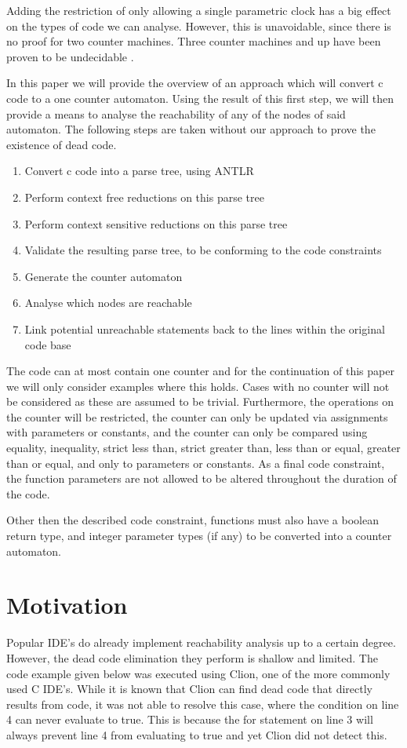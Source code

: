 \documentclass[12pt]{article}
\begin{document}
Adding the restriction of only allowing a single parametric clock has a big effect on the types of code we can analyse. However, this is unavoidable, since there is no proof for two counter machines. Three counter machines and up have been proven to be undecidable \cite{FEARNLEY201526}.

In this paper we will provide the overview of an approach which will convert c code to a one counter automaton. Using the result of this first step, we will then provide a means to analyse the reachability of any of the nodes of said automaton. The following steps are taken without our approach to prove the existence of dead code.

\begin{enumerate}
	\item Convert c code into a parse tree, using ANTLR
	\item Perform context free reductions on this parse tree
	\item Perform context sensitive reductions on this parse tree
	\item Validate the resulting parse tree, to be conforming to the code constraints
	\item Generate the counter automaton
	\item Analyse which nodes are reachable
	\item Link potential unreachable statements back to the lines within the original code base
\end{enumerate}

The code can at most contain one counter and for the continuation of this paper we will only consider examples where this holds. Cases with no counter will not be considered as these are assumed to be trivial. Furthermore, the operations on the counter will be restricted, the counter can only be updated via assignments with parameters or constants, and the counter can only be compared using equality, inequality, strict less than, strict greater than, less than or equal, greater than or equal, and only to parameters or constants. As a final code constraint, the function parameters are not allowed to be altered throughout the duration of the code.

Other then the described code constraint, functions must also have a boolean return type, and integer parameter types (if any) to be converted into a counter automaton.

\section{Motivation}
Popular IDE's do already implement reachability analysis up to a certain degree. However, the dead code elimination they perform is shallow and limited. The code example given below was executed using Clion, one of the more commonly used C IDE's. While it is known that Clion can find dead code that directly results from code, it was not able to resolve this case, where the condition on line 4 can never evaluate to true. This is because the for statement on line 3 will always prevent line 4 from evaluating to true and yet Clion did not detect this. 
\end{document}
